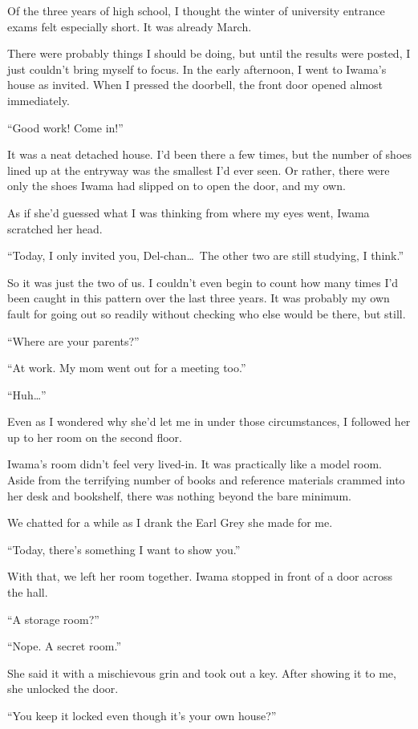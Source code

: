 \documentclass[
    a4paper,
    12pt,
    twoside,
    openany,
    UTF8,
    fontset=windows
]{ctexbook}
\begin{document}
Of the three years of high school, I thought the winter of university entrance exams felt especially short. It was already March.

There were probably things I should be doing, but until the results were posted, I just couldn't bring myself to focus. In the early afternoon, I went to Iwama's house as invited. When I pressed the doorbell, the front door opened almost immediately.

``Good work! Come in!''

It was a neat detached house. I'd been there a few times, but the number of shoes lined up at the entryway was the smallest I'd ever seen. Or rather, there were only the shoes Iwama had slipped on to open the door, and my own.

As if she'd guessed what I was thinking from where my eyes went, Iwama scratched her head.

``Today, I only invited you, Del-chan\dots\ The other two are still studying, I think.''

So it was just the two of us. I couldn't even begin to count how many times I'd been caught in this pattern over the last three years. It was probably my own fault for going out so readily without checking who else would be there, but still.

``Where are your parents?''

``At work. My mom went out for a meeting too.''

``Huh\dots''

Even as I wondered why she'd let me in under those circumstances, I followed her up to her room on the second floor.

Iwama's room didn't feel very lived-in. It was practically like a model room. Aside from the terrifying number of books and reference materials crammed into her desk and bookshelf, there was nothing beyond the bare minimum.

We chatted for a while as I drank the Earl Grey she made for me.

``Today, there's something I want to show you.''

With that, we left her room together. Iwama stopped in front of a door across the hall.

``A storage room?''

``Nope. A secret room.''

She said it with a mischievous grin and took out a key. After showing it to me, she unlocked the door.

``You keep it locked even though it's your own house?''
\end{document}
